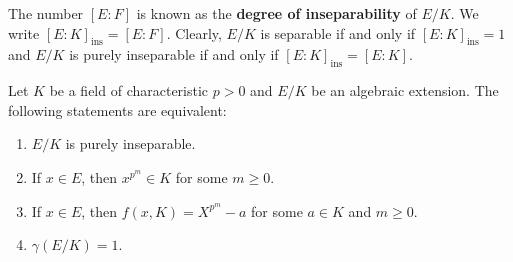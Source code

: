 The number $[E:F]$ is known as the \textbf{degree of inseparability} of $E/K$. 
We write $[E:K]_{\operatorname{ins}}=[E:F]$.
Clearly, $E/K$ is separable if and only if $[E:K]_{\operatorname{ins}}=1$ and 
$E/K$ is purely inseparable if and only if $[E:K]_{\operatorname{ins}}=[E:K]$. 

\begin{proposition}
Let $K$ be a field of characteristic $p>0$ and
$E/K$ be an algebraic extension. The following statements are equivalent:
\begin{enumerate}
    \item $E/K$ is purely inseparable.
    \item If $x\in E$, then $x^{p^m}\in K$ for some $m\geq0$.
    \item If $x\in E$, then $f(x,K)=X^{p^m}-a$ for some $a\in K$ and $m\geq0$. 
    \item $\gamma(E/K)=1$. 
\end{enumerate}
\end{proposition}

